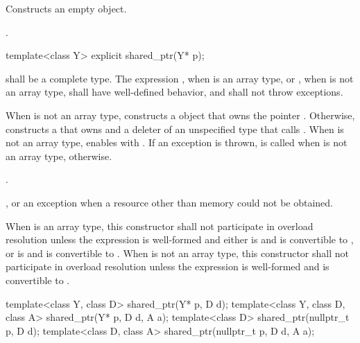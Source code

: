 \begin{itemdescr}
\pnum\effects  Constructs an empty  object.

\pnum\ensures  {}.
\end{itemdescr}

%
\begin{itemdecl}
template<class Y> explicit shared_ptr(Y* p);
\end{itemdecl}

\begin{itemdescr}
\pnum\requires {} shall be a complete type. The expression
, when  is an array type, or
, when  is not an array type,
shall have well-defined behavior, and
shall not throw exceptions.

\pnum\effects When  is not an array type,
constructs a  object
that owns the pointer .
Otherwise, constructs a 
that owns  and a deleter of an
unspecified type that calls .
When  is not an array type,
enables  with .
If an exception is thrown,  is called
when  is not an array type,  otherwise.

\pnum\ensures  {}.

\pnum\throws {}, or an  exception when a resource other than memory could not be obtained.

\pnum\remarks When  is an array type,
this constructor shall not participate in overload resolution unless
the expression  is well-formed and either
 is  and  is convertible to , or
 is  and  is convertible to .
When  is not an array type,
this constructor shall not participate in overload resolution unless
the expression  is well-formed and
 is convertible to .
\end{itemdescr}

%
\begin{itemdecl}
template<class Y, class D> shared_ptr(Y* p, D d);
template<class Y, class D, class A> shared_ptr(Y* p, D d, A a);
template<class D> shared_ptr(nullptr_t p, D d);
template<class D, class A> shared_ptr(nullptr_t p, D d, A a);
\end{itemdecl}


